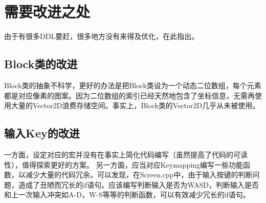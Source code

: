 \documentclass[UTF8]{ctexart}
\begin{document}
\section{需要改进之处}
    由于有很多DDL要赶，很多地方没有来得及优化，在此指出。
\subsection{Block类的改进}

    Block类的抽象不科学，更好的办法是把Block类设为一个动态二位数组，每个元素都是对应像素的图案。因为二位数组的索引已经天然地包含了坐标信息，无需再使用大量的Vector2D浪费存储空间。事实上，Block类的Vector2D几乎从未被使用。
\subsection{输入Key的改进}
    一方面，设定对应的宏并没有在事实上简化代码编写（虽然提高了代码的可读性），值得探索更好的方案。
    另一方面，应当对应Keymapping编写一些功能函数，以减少大量的代码冗余。可以发现，在Screen.cpp中，由于输入按键的判断问题，造成了丑陋而冗长的if语句。应该编写判断输入是否为WASD，判断输入是否和上一次输入冲突如A-D，W-S等等的判断函数，可以有效减少冗长的if语句。
\end{document}
